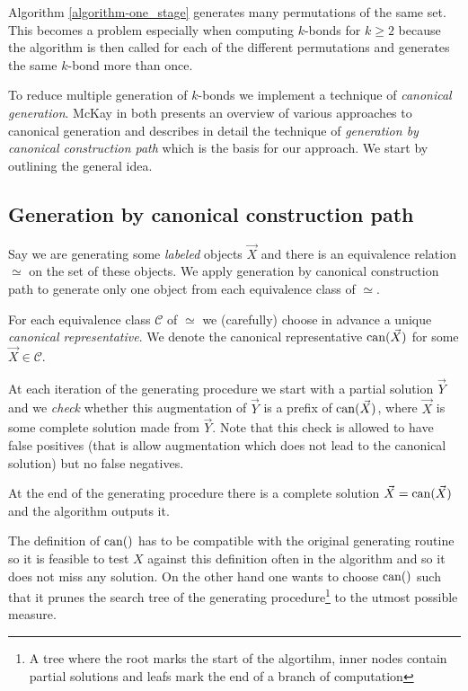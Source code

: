 Algorithm \ref{algorithm-one_stage} generates many permutations of the same set. This becomes a problem especially when computing $k$-bonds for $k \geq 2$ because the algorithm is then called for each of the different permutations and generates the same $k$-bond more than once.

To reduce multiple generation of $k$-bonds we implement a technique of \textit{canonical generation}. McKay in \cite{mckay_isom} both presents an overview of various approaches to canonical generation and describes in detail the technique of \textit{generation by canonical construction path} which is the basis for our approach. We start by outlining the general idea.

\subsection*{Generation by canonical construction path}

Say we are generating some \textit{labeled} objects $\vec X$ and there is an equivalence relation $\simeq$ on the set of these objects. We apply generation by canonical construction path to generate only one object from each equivalence class of $\simeq$.

For each equivalence class $\mathcal{C}$ of $\simeq$ we (carefully) choose in advance a unique \textit{canonical representative}. We denote the canonical representative $\operatorname{can}(\vec X)$ for some $\vec X \in \mathcal{C}$.

At each iteration of the generating procedure we start with a partial solution $\vec Y$ and we \textit{check} whether this augmentation of $\vec Y$ is a prefix of $\operatorname{can}(\vec X)$, where $\vec X$ is some complete solution made from $\vec Y$. Note that this check is allowed to have false positives (that is allow augmentation which does not lead to the canonical solution) but no false negatives.

At the end of the generating procedure there is a complete solution \linebreak ${\vec X = \operatorname{can}(\vec{X}) }$ and the algorithm outputs it.

\sectionline

The definition of $\operatorname{can}()$ has to be compatible with the original generating routine so it is feasible to test $X$ against this definition often in the algorithm and so it does not miss any solution. On the other hand one wants to choose $\operatorname{can}()$ such that it prunes the search tree of the generating procedure\footnote{A tree where the root marks the start of the algortihm, inner nodes contain partial solutions and leafs mark the end of a branch of computation} to the utmost possible measure.

